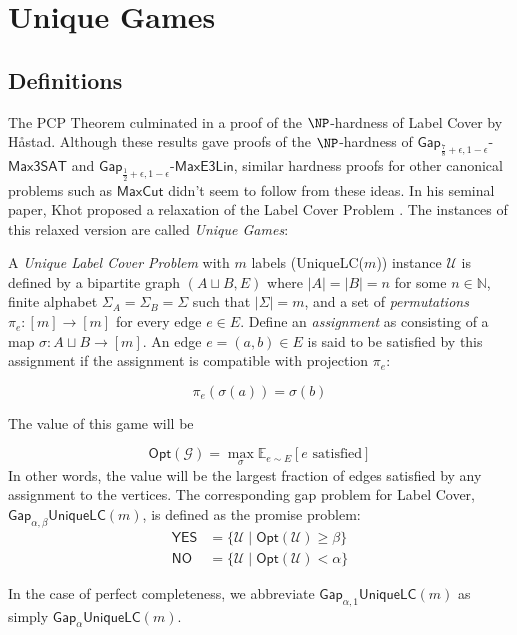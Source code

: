 \section{Unique Games}
\subsection{Definitions}
The PCP Theorem culminated in a proof of the $\NP$-hardness of Label Cover by H\aa stad. Although these results gave proofs of the $\NP$-hardness of $\mathsf{Gap}_{\frac{7}{8} + \epsilon, 1- \epsilon}$-$\mathsf{Max3SAT}$ and $\mathsf{Gap}_{\frac{1}{2} + \epsilon, 1- \epsilon}$-$\mathsf{MaxE3Lin}$, similar hardness proofs for other canonical problems such as $\mathsf{MaxCut}$ didn't seem to follow from these ideas. In his seminal paper, Khot proposed a relaxation of the Label Cover Problem \cite{khot2002power}. The instances of this relaxed version are called \emph{Unique Games}:

\begin{definition}
  A \emph{Unique Label Cover Problem} with $m$ labels (UniqueLC($m$)) instance $\mathcal{U}$ is defined by a bipartite graph $(A \sqcup B,E)$ where $|A| = |B| = n$ for some $n \in \mathbb{N}$, finite alphabet $\Sigma_A = \Sigma_B = \Sigma$ such that $|\Sigma| = m$, and a set of \emph{permutations} $\pi_e:[m] \rightarrow [m]$ for every edge $e \in E$. Define an \emph{assignment} as consisting of a map $\sigma: A \sqcup B \rightarrow [m]$. An edge $e = (a,b) \in E$ is said to be satisfied by this assignment if the assignment is compatible with projection $\pi_e$:

  \begin{equation}
    \pi_e(\sigma(a)) = \sigma(b)
  \end{equation}

  The value of this game will be

  \begin{equation} \label{optvalLC}
    \mathsf{Opt}(\mathcal{G}) = \max_{\sigma} \mathbb{E}_{e \sim E}[e \text{ satisfied}]
  \end{equation}
  In other words, the value will be the largest fraction of edges satisfied by any assignment to the vertices. The corresponding gap problem for Label Cover, $\mathsf{Gap}_{\alpha,\beta}\mathsf{UniqueLC}(m)$, is defined as the promise problem:
  \begin{align*}
      \mathsf{YES} & = \{\mathcal{U} \mid \mathsf{Opt}(\mathcal{U}) \geq \beta\} \\
      \mathsf{NO} & = \{\mathcal{U} \mid \mathsf{Opt}(\mathcal{U}) < \alpha \}
  \end{align*}

  In the case of perfect completeness, we abbreviate $\mathsf{Gap}_{\alpha,1}\mathsf{UniqueLC}(m)$ as simply $\mathsf{Gap}_{\alpha}\mathsf{UniqueLC}(m)$.
\end{definition}

